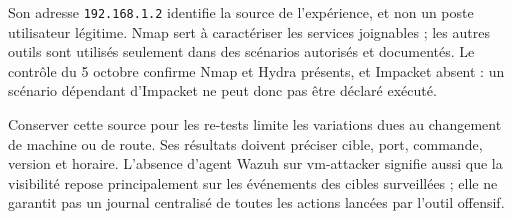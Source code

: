 \documentclass[a4paper,12pt]{report}
\begin{document}
Son adresse \texttt{192.168.1.2} identifie la source de l'expérience, et non un poste utilisateur légitime. Nmap sert à caractériser les services joignables ; les autres outils sont utilisés seulement dans des scénarios autorisés et documentés. Le contrôle du 5 octobre confirme Nmap et Hydra présents, et Impacket absent : un scénario dépendant d'Impacket ne peut donc pas être déclaré exécuté.

Conserver cette source pour les re-tests limite les variations dues au changement de machine ou de route. Ses résultats doivent préciser cible, port, commande, version et horaire. L'absence d'agent Wazuh sur vm-attacker signifie aussi que la visibilité repose principalement sur les événements des cibles surveillées ; elle ne garantit pas un journal centralisé de toutes les actions lancées par l'outil offensif.
\end{document}
